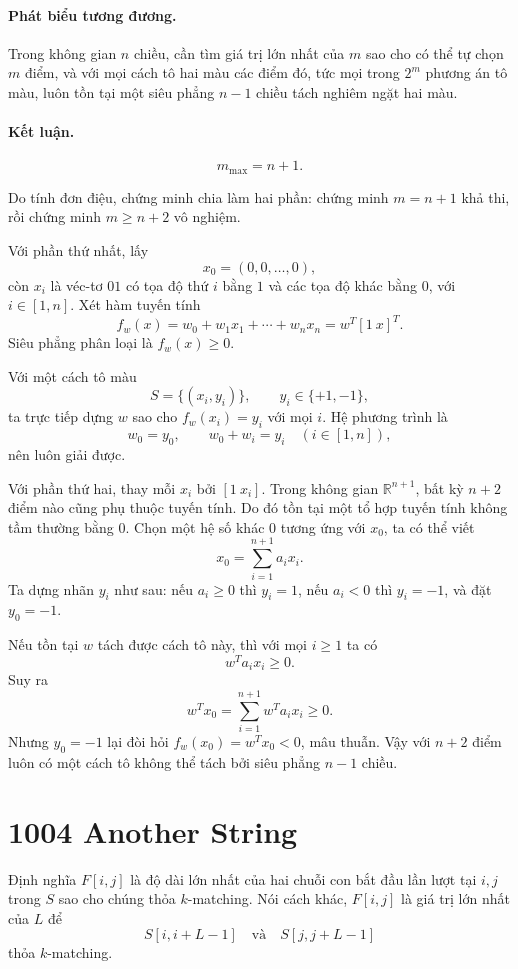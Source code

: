 \documentclass[11pt]{article}
\begin{document}
\paragraph{Phát biểu tương đương.}
Trong không gian $n$ chiều, cần tìm giá trị lớn nhất của $m$ sao cho có thể
tự chọn $m$ điểm, và với mọi cách tô hai màu các điểm đó, tức mọi trong
$2^m$ phương án tô màu, luôn tồn tại một siêu phẳng $n-1$ chiều tách nghiêm
ngặt hai màu.

\paragraph{Kết luận.}
\[
  m_{\max}=n+1.
\]

Do tính đơn điệu, chứng minh chia làm hai phần: chứng minh $m=n+1$ khả thi,
rồi chứng minh $m\ge n+2$ vô nghiệm.

Với phần thứ nhất, lấy
\[
  x_0=(0,0,\ldots,0),
\]
còn $x_i$ là véc-tơ $01$ có tọa độ thứ $i$ bằng $1$ và các tọa độ khác bằng
$0$, với $i\in[1,n]$. Xét hàm tuyến tính
\[
  f_w(x)=w_0+w_1x_1+\cdots+w_nx_n=w^T[1\ x]^T.
\]
Siêu phẳng phân loại là $f_w(x)\ge 0$.

Với một cách tô màu
\[
  S=\{(x_i,y_i)\},\qquad y_i\in\{+1,-1\},
\]
ta trực tiếp dựng $w$ sao cho $f_w(x_i)=y_i$ với mọi $i$. Hệ phương trình là
\[
  w_0=y_0,\qquad w_0+w_i=y_i\quad (i\in[1,n]),
\]
nên luôn giải được.

Với phần thứ hai, thay mỗi $x_i$ bởi $[1\ x_i]$. Trong không gian
$\mathbb{R}^{n+1}$, bất kỳ $n+2$ điểm nào cũng phụ thuộc tuyến tính. Do đó
tồn tại một tổ hợp tuyến tính không tầm thường bằng $0$. Chọn một hệ số khác
$0$ tương ứng với $x_0$, ta có thể viết
\[
  x_0=\sum_{i=1}^{n+1} a_ix_i.
\]
Ta dựng nhãn $y_i$ như sau: nếu $a_i\ge 0$ thì $y_i=1$, nếu $a_i<0$ thì
$y_i=-1$, và đặt $y_0=-1$.

Nếu tồn tại $w$ tách được cách tô này, thì với mọi $i\ge 1$ ta có
\[
  w^Ta_ix_i\ge 0.
\]
Suy ra
\[
  w^Tx_0=\sum_{i=1}^{n+1}w^Ta_ix_i\ge 0.
\]
Nhưng $y_0=-1$ lại đòi hỏi $f_w(x_0)=w^Tx_0<0$, mâu thuẫn. Vậy với
$n+2$ điểm luôn có một cách tô không thể tách bởi siêu phẳng $n-1$ chiều.

\section{1004 Another String}

Định nghĩa $F[i,j]$ là độ dài lớn nhất của hai chuỗi con bắt đầu lần lượt tại
$i,j$ trong $S$ sao cho chúng thỏa $k$-matching. Nói cách khác, $F[i,j]$ là
giá trị lớn nhất của $L$ để
\[
  S[i,i+L-1]\quad\text{và}\quad S[j,j+L-1]
\]
thỏa $k$-matching.
\end{document}
